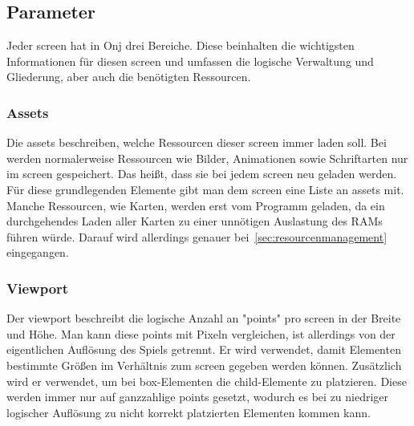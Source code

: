 \renewcommand{\kapitelautor}{Autor: Felix Zwickelstorfer}
\subsection{Parameter}\label{subsec:parameter}
\renewcommand{\kapitelautor}{Autor: Felix Zwickelstorfer}

Jeder screen hat in Onj drei Bereiche.
Diese beinhalten die wichtigsten Informationen für diesen screen und umfassen die logische Verwaltung und Gliederung, aber auch die benötigten Ressourcen.

\renewcommand{\kapitelautor}{Autor: Felix Zwickelstorfer}
\subsubsection{Assets}\label{subsubsec:assets}
\renewcommand{\kapitelautor}{Autor: Felix Zwickelstorfer}
Die assets beschreiben, welche Ressourcen dieser screen immer laden soll. 
Bei \FF werden normalerweise Ressourcen wie Bilder, Animationen sowie Schriftarten nur im screen gespeichert. 
Das heißt, dass sie bei jedem screen neu geladen werden. 
Für diese grundlegenden Elemente gibt man dem screen eine Liste an assets mit.
Manche Ressourcen, wie \zB Karten, werden erst vom Programm geladen, da ein durchgehendes Laden aller Karten zu einer unnötigen Auslastung des RAMs führen würde.
Darauf wird allerdings genauer bei~\ref{sec:resourcenmanagement} eingegangen.

\renewcommand{\kapitelautor}{Autor: Felix Zwickelstorfer}
\subsubsection{Viewport}\label{subsubsec:viewport}
\renewcommand{\kapitelautor}{Autor: Felix Zwickelstorfer}
Der viewport beschreibt die logische Anzahl an "points" pro screen in der Breite und Höhe. 
Man kann diese points mit Pixeln vergleichen, ist allerdings von der eigentlichen Auflösung des Spiels getrennt.
Er wird verwendet, damit Elementen bestimmte Größen im Verhältnis zum screen gegeben werden können.
Zusätzlich wird er verwendet, um bei box-Elementen die child-Elemente zu platzieren.
Diese werden immer nur auf ganzzahlige points gesetzt, wodurch es bei zu niedriger logischer Auflösung zu nicht korrekt platzierten Elementen kommen kann.

\renewcommand{\kapitelautor}{Autor: Felix Zwickelstorfer}
